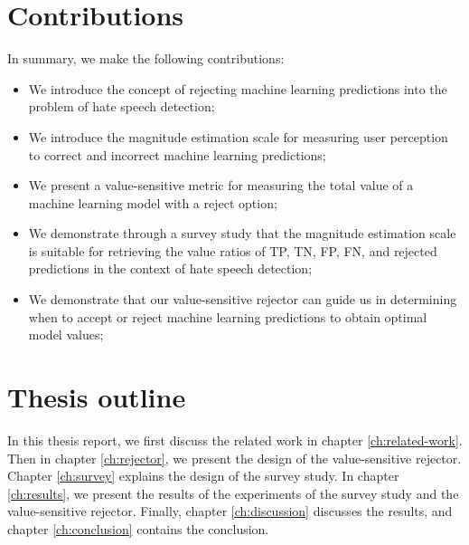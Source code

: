 \section{Contributions}
In summary, we make the following contributions:
%
\begin{itemize}
	\item We introduce the concept of rejecting machine learning predictions into the problem of hate speech detection;
	\item We introduce the magnitude estimation scale for measuring user perception to correct and incorrect machine learning predictions;
	\item We present a value-sensitive metric for measuring the total value of a machine learning model with a reject option;
	\item We demonstrate through a survey study that the magnitude estimation scale is suitable for retrieving the value ratios of TP, TN, FP, FN, and rejected predictions in the context of hate speech detection;
	\item We demonstrate that our value-sensitive rejector can guide us in determining when to accept or reject machine learning predictions to obtain optimal model values;
\end{itemize}

\section{Thesis outline}
%
In this thesis report, we first discuss the related work in chapter \ref{ch:related-work}.
%
Then in chapter \ref{ch:rejector}, we present the design of the value-sensitive rejector.
%
Chapter \ref{ch:survey} explains the design of the survey study.
%
In chapter \ref{ch:results}, we present the results of the experiments of the survey study and the value-sensitive rejector.
%
Finally, chapter \ref{ch:discussion} discusses the results, and chapter \ref{ch:conclusion} contains the conclusion.
